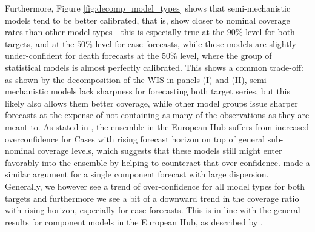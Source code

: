 Furthermore, Figure \ref{fig:decomp_model_types} shows that semi-mechanistic models tend to be better calibrated, that is, show closer to nominal coverage rates than other model types - this is especially true at the $90\%$ level for both targets, and at the $50\%$ level for case forecasts, while these models are slightly under-confident for death forecasts at the $50\%$ level, where the group of statistical models is almost perfectly calibrated. This shows a common trade-off: as shown by the decomposition of the WIS in panels (I) and (II), semi-mechanistic models lack sharpness for forecasting both target series, but this likely also allows them better coverage, while other model groups issue sharper forecasts at the expense of not containing as many of the observations as they are meant to. As stated in \cite{sherratt_european_2022}, the ensemble in the European Hub suffers from increased overconfidence for Cases with rising forecast horizon on top of general sub-nominal coverage levels, which suggests that these models still might enter favorably into the ensemble by helping to counteract that over-confidence. \cite{bracher_evaluating_2021} made a similar argument for a single component forecast with large dispersion.\\ %
Generally, we however see a trend of over-confidence for all model types for both targets and furthermore we see a bit of a downward trend in the coverage ratio with rising horizon, especially for case forecasts. This is in line with the general results for component models in the European Hub, as described by \cite{sherratt_european_2022}.
